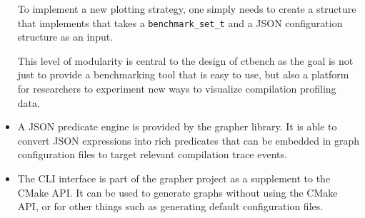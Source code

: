 \documentclass[../main]{subfiles}
\begin{document}
\begin{itemize}
  To implement a new plotting strategy, one simply needs to create a structure
  that implements that takes a \lstinline{benchmark_set_t} and a
  JSON configuration structure as an input.

  This level of modularity is central to the design of ctbench
  as the goal is not just to provide a benchmarking tool that is easy to use,
  but also a platform for researchers to experiment new ways to visualize
  compilation profiling data.

\item

  A JSON predicate engine is provided by the grapher library.
  It is able to convert JSON expressions into rich predicates
  that can be embedded in graph configuration files to target
  relevant compilation trace events.

\item

  The CLI interface is part of the grapher project as a supplement
  to the CMake API. It can be used to generate graphs without using
  the CMake API, or for other things such as generating default
  configuration files.

\end{itemize}
\end{document}
